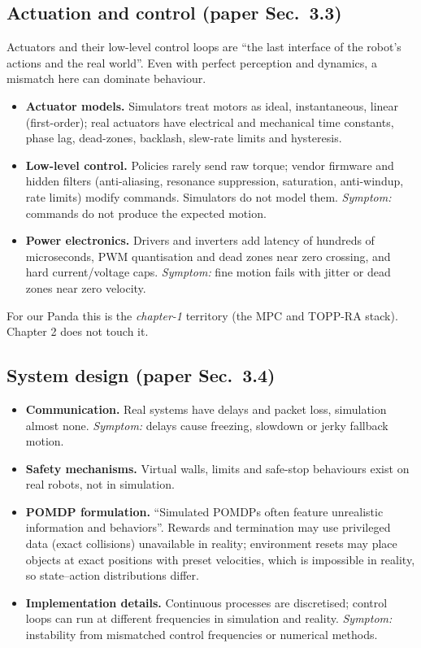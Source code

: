 \documentclass[11pt,a4paper]{article}
\begin{document}
\subsection{Actuation and control \textnormal{(paper Sec.~3.3)}}
Actuators and their low-level control loops are ``the last interface of the robot's actions and
the real world''. Even with perfect perception and dynamics, a mismatch here can dominate
behaviour.
\begin{itemize}
\item \textbf{Actuator models.} Simulators treat motors as ideal, instantaneous, linear
(first-order); real actuators have electrical and mechanical time constants, phase lag,
dead-zones, backlash, slew-rate limits and hysteresis.
\item \textbf{Low-level control.} Policies rarely send raw torque; vendor firmware and hidden
filters (anti-aliasing, resonance suppression, saturation, anti-windup, rate limits) modify
commands. Simulators do not model them. \emph{Symptom:} commands do not produce the expected
motion.
\item \textbf{Power electronics.} Drivers and inverters add latency of hundreds of microseconds,
PWM quantisation and dead zones near zero crossing, and hard current/voltage caps. \emph{Symptom:}
fine motion fails with jitter or dead zones near zero velocity.
\end{itemize}
For our Panda this is the \emph{chapter-1} territory (the MPC and TOPP-RA stack). Chapter 2 does
not touch it.

\subsection{System design \textnormal{(paper Sec.~3.4)}}
\begin{itemize}
\item \textbf{Communication.} Real systems have delays and packet loss, simulation almost none.
\emph{Symptom:} delays cause freezing, slowdown or jerky fallback motion.
\item \textbf{Safety mechanisms.} Virtual walls, limits and safe-stop behaviours exist on real
robots, not in simulation.
\item \textbf{POMDP formulation.} ``Simulated POMDPs often feature unrealistic information and
behaviors''. Rewards and termination may use privileged data (exact collisions) unavailable in
reality; environment resets may place objects at exact positions with preset velocities, which is
impossible in reality, so state--action distributions differ.
\item \textbf{Implementation details.} Continuous processes are discretised; control loops can
run at different frequencies in simulation and reality. \emph{Symptom:} instability from
mismatched control frequencies or numerical methods.
\end{itemize}
\end{document}
